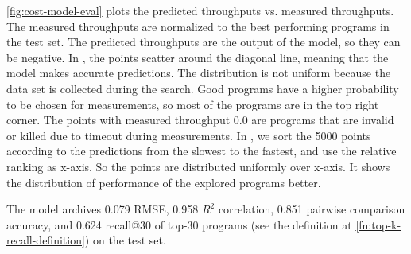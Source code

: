 \autoref{fig:cost-model-eval} plots the predicted throughputs vs. measured throughputs.
The measured throughputs are normalized to the best performing programs in the test set.
The predicted throughputs are the output of the model, so they can be negative.
In , the points scatter around the diagonal line, meaning that the model makes accurate predictions.
The distribution is not uniform because the data set is collected during the search. Good programs have a higher probability to be chosen for measurements, so most of the programs are in the top right corner.
The points with measured throughput 0.0 are programs that are invalid or killed due to timeout during measurements.
In , we sort the 5000 points according to the predictions from the slowest to the fastest, and use the relative ranking as x-axis.
So the points are distributed uniformly over x-axis. It shows the distribution of performance of the explored programs better.

The model archives  0.079 RMSE, 0.958 $R^2$ correlation, 0.851 pairwise comparison accuracy, and 0.624 recall@30 of top-30 programs (see the definition at \autoref{fn:top-k-recall-definition}) on the test set.
